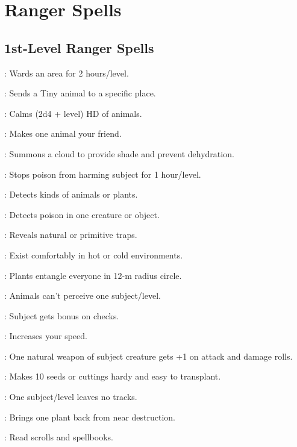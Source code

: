 \section{Ranger Spells}



\subsection{1st-Level Ranger Spells}

: Wards an area for 2 hours/level.

: Sends a Tiny animal to a specific place.

: Calms (2d4 + level) HD of animals.

: Makes one animal your friend.

: Summons a cloud to provide shade and prevent dehydration. %

: Stops poison from harming subject for 1 hour/level.

: Detects kinds of animals or plants.

: Detects poison in one creature or object.

: Reveals natural or primitive traps.

: Exist comfortably in hot or cold environments.

: Plants entangle everyone in 12-m radius circle.

: Animals can't perceive one subject/level.

: Subject gets bonus on  checks.

: Increases your speed.

: One natural weapon of subject creature gets +1 on attack and damage rolls.

: Makes 10 seeds or cuttings hardy and easy to transplant. %

: One subject/level leaves no tracks.

: Brings one plant back from near destruction. %

: Read scrolls and spellbooks.

